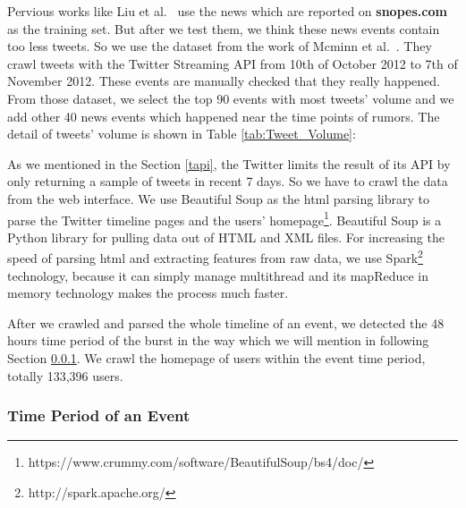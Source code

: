 Pervious works like Liu et al.~\cite{liu2015real} use the news which are reported on \textbf{snopes.com} as the training set. But after we test them, we think these news events contain too less tweets. So we use the dataset from the work of Mcminn et al.~\cite{mcminn2013building}. They crawl tweets with the Twitter Streaming API  from 10th of October 2012 to 7th of November 2012. These events are manually checked that they really happened. From those dataset, we select the top 90 events with most tweets' volume and we add other 40 news events which happened near the time points of rumors. The detail of tweets' volume is shown in Table \ref{tab:Tweet_Volume}:
\begin{table}[!h]
 \centering
{}
 \caption{Tweet Volume of News and Rumors}
 \label{tab:Tweet_Volume}
\end{table}

As we mentioned in the Section \ref{tapi}, the Twitter limits the result of its API by only returning a sample of tweets in recent 7 days. So we have to crawl the data from the web interface. We use Beautiful Soup as the html parsing library to parse the Twitter timeline pages and the users' homepage\footnote{https://www.crummy.com/software/BeautifulSoup/bs4/doc/}. Beautiful Soup is a Python library for pulling data out of HTML and XML files. For increasing the speed of parsing html and extracting features from raw data, we use Spark\footnote{http://spark.apache.org/} technology, because it can simply manage multithread and its mapReduce in memory technology makes the process much faster. 

 After we crawled and parsed the whole timeline of an event, we detected the 48 hours time period of the burst in the way which we will mention in following Section \ref{sec:Time_Period_of_an_Event}. We crawl the homepage of users within the event time period, totally 133,396 users.
 
  \subsubsection{Time Period of an Event}
\label{sec:Time_Period_of_an_Event}

